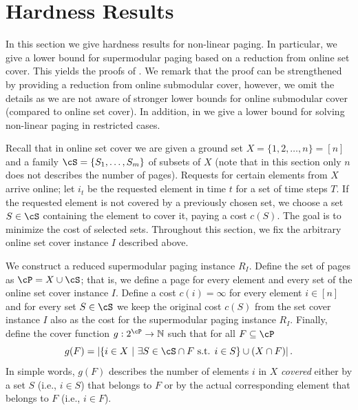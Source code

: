 \section{Hardness Results}
\label{sec:hardness}


In this section we give hardness results for non-linear paging. In particular, we give a lower bound for supermodular paging based on a reduction from online set cover. This yields the proofs of . We remark that the proof can be strengthened by providing a reduction from online submodular cover, however, we omit the details as we are not aware of stronger lower bounds for online submodular cover (compared to online set cover). In addition, in  we give a lower bound for solving non-linear paging in restricted cases. %

 Recall that in online set cover we are given  a ground set $X = \{1,2,\ldots, n\} = [n]$ and a family $\cS = \{S_1,\ldots, S_m\}$ of subsets of $X$ (note that in this section only $n$ does not describes the number of pages). Requests for certain elements from $X$ arrive online; let $i_t$ be the requested element in time $t$ for a set of time steps $T$. If the requested element is not covered by a previously chosen set, we choose a set $S \in \cS$ containing the element to cover it, paying a cost $c(S)$. The goal is to minimize the cost of selected sets. Throughout this section, we fix the arbitrary online set cover instance $I$ described above. 

We construct a reduced supermodular paging instance $R_I$. Define the set of pages as $\cP = X \cup \cS$; that is, we define a page for every element and every set of the online set cover instance $I$. Define a cost $c(i) = \infty$ for every element $i \in [n]$ and for every set $S \in \cS$ we keep the original cost $c(S)$ from the set cover instance $I$ also as the cost for the supermodular paging instance $R_I$. Finally, define the cover function $g: 2^{\cP} \rightarrow \mathbb{N}$ such that for all $F \subseteq \cP$ 
\begin{equation}
	\label{eq:g}
	g(F) = \left| \{i \in X~|~ \exists S \in \cS \cap F \text{ s.t. } i \in S\} \cup \left(X \cap F\right) \right|. 
\end{equation} In simple words, $g(F)$ describes the number of elements $i$ in $X$ {\em covered} either by a set $S$ (i.e., $i \in S$) that belongs to $F$ or by the actual corresponding element that belongs to $F$ (i.e., $i \in F$). %

